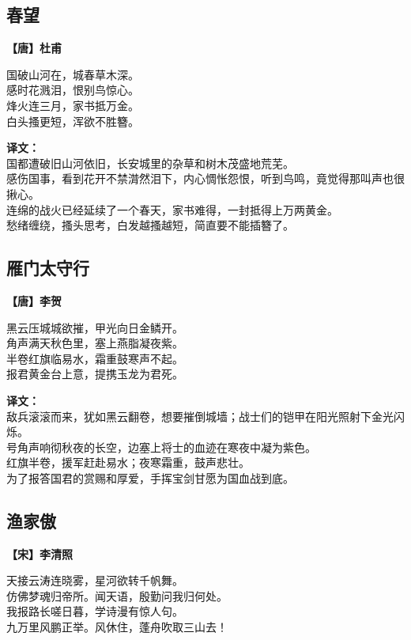 
\subsection*{春望}
\textbf{【唐】杜甫}

国破山河在，城春草木深。\\
感时花溅泪，恨别鸟惊心。\\
烽火连三月，家书抵万金。\\
白头搔更短，浑欲不胜簪。

\bigskip
\noindent\textbf{译文：}\\
国都遭破旧山河依旧，长安城里的杂草和树木茂盛地荒芜。\\
感伤国事，看到花开不禁潸然泪下，内心惆怅怨恨，听到鸟鸣，竟觉得那叫声也很揪心。\\
连绵的战火已经延续了一个春天，家书难得，一封抵得上万两黄金。\\
愁绪缠绕，搔头思考，白发越搔越短，简直要不能插簪了。


\subsection*{雁门太守行}
\textbf{【唐】李贺}

黑云压城城欲摧，甲光向日金鳞开。\\
角声满天秋色里，塞上燕脂凝夜紫。\\
半卷红旗临易水，霜重鼓寒声不起。\\
报君黄金台上意，提携玉龙为君死。

\bigskip
\noindent\textbf{译文：}\\
敌兵滚滚而来，犹如黑云翻卷，想要摧倒城墙；战士们的铠甲在阳光照射下金光闪烁。\\
号角声响彻秋夜的长空，边塞上将士的血迹在寒夜中凝为紫色。\\
红旗半卷，援军赶赴易水；夜寒霜重，鼓声悲壮。\\
为了报答国君的赏赐和厚爱，手挥宝剑甘愿为国血战到底。


\subsection*{渔家傲}
\textbf{【宋】李清照}

天接云涛连晓雾，星河欲转千帆舞。\\
仿佛梦魂归帝所。闻天语，殷勤问我归何处。\\
我报路长嗟日暮，学诗漫有惊人句。\\
九万里风鹏正举。风休住，蓬舟吹取三山去！

